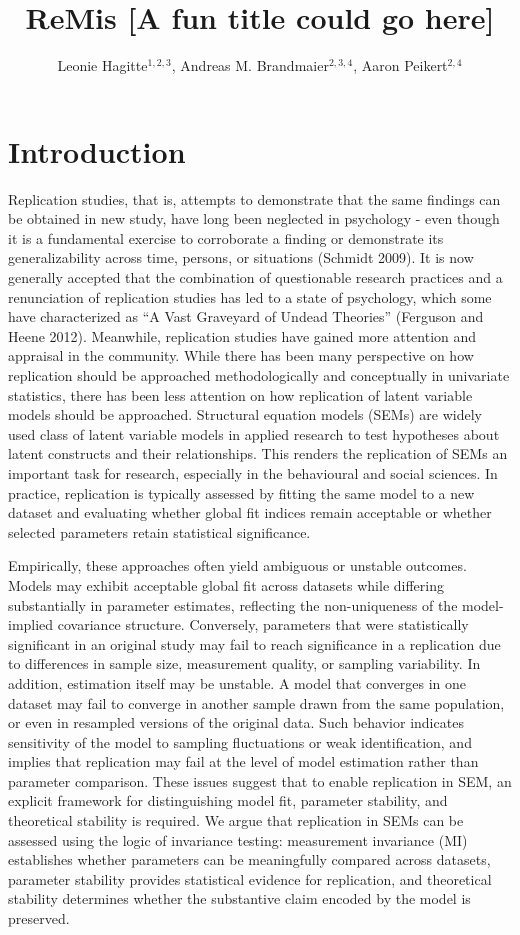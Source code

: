 \documentclass[
  12pt,
  letterpaper,
  man]{apa7}
\affiliation{$^{1}$Goethe University Frankfurt\\
$^{2}$Max Planck Institute for Human Development{,} Berlin{,} Germany\\
$^{3}$MSB Medical School Berlin{,} Berlin{,} Germany\\
$^{4}$Max Planck UCL Centre for Computational Psychiatry and Ageing Research{,} Berlin{,} Germany}
\title{ReMis {[}A fun title could go here{]}}
\author{Leonie Hagitte\(^{1,2,3}\), Andreas M. Brandmaier\(^{2,3,4}\),
Aaron Peikert\(^{2,4}\)}
\date{}
\begin{document}
\maketitle


\section{Introduction}\label{introduction}

Replication studies, that is, attempts to demonstrate that the same
findings can be obtained in new study, have long been neglected in
psychology - even though it is a fundamental exercise to corroborate a
finding or demonstrate its generalizability across time, persons, or
situations (Schmidt 2009). It is now generally accepted that the
combination of questionable research practices and a renunciation of
replication studies has led to a state of psychology, which some have
characterized as ``A Vast Graveyard of Undead Theories'' (Ferguson and
Heene 2012). Meanwhile, replication studies have gained more attention
and appraisal in the community. While there has been many perspective on
how replication should be approached methodologically and conceptually
in univariate statistics, there has been less attention on how
replication of latent variable models should be approached. Structural
equation models (SEMs) are widely used class of latent variable models
in applied research to test hypotheses about latent constructs and their
relationships. This renders the replication of SEMs an important task
for research, especially in the behavioural and social sciences. In
practice, replication is typically assessed by fitting the same model to
a new dataset and evaluating whether global fit indices remain
acceptable or whether selected parameters retain statistical
significance.

Empirically, these approaches often yield ambiguous or unstable
outcomes. Models may exhibit acceptable global fit across datasets while
differing substantially in parameter estimates, reflecting the
non-uniqueness of the model-implied covariance structure. Conversely,
parameters that were statistically significant in an original study may
fail to reach significance in a replication due to differences in sample
size, measurement quality, or sampling variability. In addition,
estimation itself may be unstable. A model that converges in one dataset
may fail to converge in another sample drawn from the same population,
or even in resampled versions of the original data. Such behavior
indicates sensitivity of the model to sampling fluctuations or weak
identification, and implies that replication may fail at the level of
model estimation rather than parameter comparison. These issues suggest
that to enable replication in SEM, an explicit framework for
distinguishing model fit, parameter stability, and theoretical stability
is required. We argue that replication in SEMs can be assessed using the
logic of invariance testing: measurement invariance (MI) establishes
whether parameters can be meaningfully compared across datasets,
parameter stability provides statistical evidence for replication, and
theoretical stability determines whether the substantive claim encoded
by the model is preserved.
\end{document}
